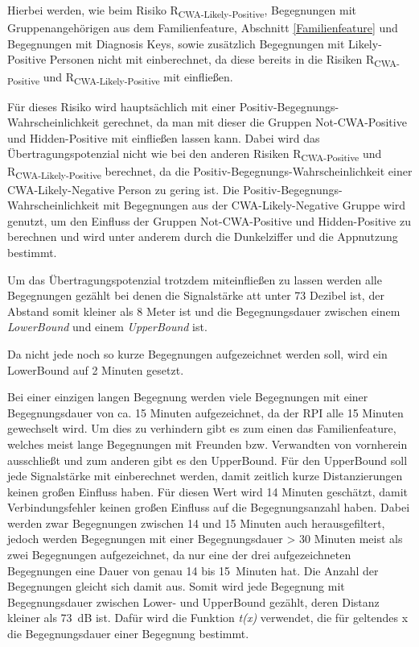 \documentclass[conference,compsoc]{IEEEtran}
\begin{document}
Hierbei werden, wie beim Risiko R\textsubscript{CWA-Likely-Positive}, 
Begegnungen mit Gruppenangehörigen aus dem Familienfeature, Abschnitt \ref{Familienfeature} und Begegnungen mit Diagnosis Keys, 
sowie zusätzlich Begegnungen mit Likely-Positive Personen nicht mit einberechnet, 
da diese bereits in die Risiken R\textsubscript{CWA-Positive} und R\textsubscript{CWA-Likely-Positive} mit einfließen.

Für dieses Risiko wird hauptsächlich mit einer Positiv-Begegnungs-Wahrscheinlichkeit gerechnet,
da man mit dieser die Gruppen Not-CWA-Positive und Hidden-Positive mit einfließen lassen kann.
Dabei wird das Übertragungspotenzial nicht wie bei den anderen Risiken R\textsubscript{CWA-Positive} und R\textsubscript{CWA-Likely-Positive} berechnet, 
da die Positiv-Begegnungs-Wahrscheinlichkeit einer CWA-Likely-Negative Person zu gering ist. 
Die Positiv-Begegnungs-Wahrscheinlichkeit mit Begegnungen aus der CWA-Likely-Negative Gruppe wird genutzt,
um den Einfluss der Gruppen Not-CWA-Positive und Hidden-Positive zu berechnen und wird unter anderem durch die Dunkelziffer und die Appnutzung bestimmt.

Um das Übertragungspotenzial trotzdem miteinfließen zu lassen werden alle Begegnungen gezählt bei denen die Signalstärke att unter 73 Dezibel ist,
der Abstand somit kleiner als 8 Meter ist und die Begegnungsdauer zwischen einem \textit{LowerBound} und einem \textit{UpperBound} ist. 

Da nicht jede noch so kurze Begegnungen aufgezeichnet werden soll,
wird ein LowerBound auf 2 Minuten gesetzt. 

Bei einer einzigen langen Begegnung werden viele Begegnungen mit einer Begegnungsdauer von ca.
15 Minuten aufgezeichnet, da der RPI alle 15 Minuten gewechselt wird. 
Um dies zu verhindern gibt es zum einen das Familienfeature, 
welches meist lange Begegnungen mit Freunden bzw. Verwandten von vornherein ausschließt und zum anderen gibt es den UpperBound.
Für den UpperBound soll jede Signalstärke mit einberechnet werden, damit zeitlich kurze Distanzierungen keinen großen Einfluss haben.
Für diesen Wert wird 14 Minuten geschätzt, damit Verbindungsfehler keinen großen Einfluss auf die Begegnungsanzahl haben.
Dabei werden zwar Begegnungen zwischen 14 und 15 Minuten auch herausgefiltert, 
jedoch werden Begegnungen mit einer Begegnungsdauer > 30 Minuten meist als zwei Begegnungen aufgezeichnet,
da nur eine der drei aufgezeichneten Begegnungen eine Dauer von genau 14 bis \SI{15}{Minuten} hat.
Die Anzahl der Begegnungen gleicht sich damit aus.
Somit wird jede Begegnung mit Begegnungsdauer zwischen Lower- und UpperBound gezählt, deren Distanz kleiner als \SI{73}{dB} ist.
Dafür wird die Funktion \textit{t(x)} verwendet, die für geltendes x die Begegnungsdauer einer Begegnung bestimmt.
\end{document}
